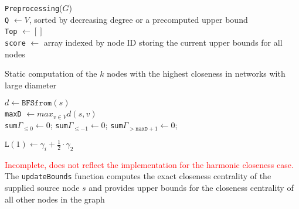 \begin{algorithm2e}[h!]
 \label{alg:streetNetworksStatic}
 \texttt{Preprocessing}($G$) \\
 \texttt{Q} $\gets V$, sorted by decreasing degree or a precomputed upper bound \\
 \texttt{Top} $\gets []$ \\
 \texttt{score} $\gets $ array indexed by node ID storing the current upper bounds for all nodes 
 
 
  
 \caption{Static computation of the $k$ nodes with the highest closeness in networks with large diameter}
\end{algorithm2e}

\begin{algorithm2e}[h!]
	\label{alg:streetNetworksStatic}
  
  $d \gets \texttt{BFSfrom}(s)$ \\
  \texttt{maxD} $\gets max_{v \in V}d(s, v)$ \\
  \texttt{sum}$\Gamma_{\leq 0} \gets 0$; \texttt{sum}$\Gamma_{\leq -1} \gets 0$;  \texttt{sum}$\Gamma_{>\texttt{maxD} + 1} \gets 0$;
  
  
  $\texttt{L}(1) \gets \gamma_i + \frac{1}{2} \cdot \gamma_2$
  
  
 \caption{\textcolor{red}{Incomplete, does not reflect the implementation for the harmonic closeness case.} The \texttt{updateBounds} function computes the exact closeness centrality of the supplied source node $s$ and provides upper bounds for the closeness centrality of all other nodes in the graph}

\end{algorithm2e}


